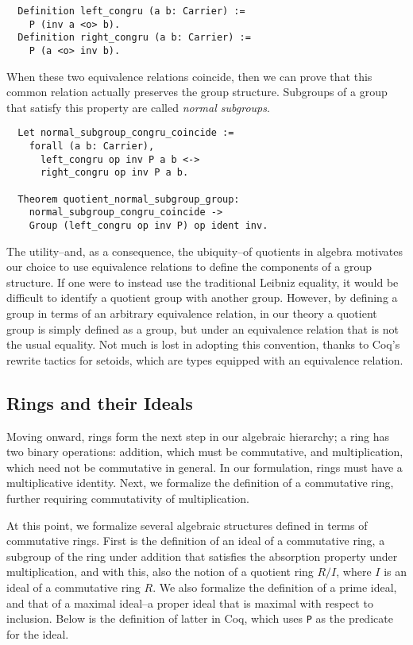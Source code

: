 \documentclass[referee,sn-mathphys]{sn-jnl}
\theoremstyle{definition}
\theoremstyle{remark}
\numberwithin{equation}{section}
\numberwithin{figure}{subsection}
\begin{document}
\begin{verbatim}
  Definition left_congru (a b: Carrier) :=
    P (inv a <o> b).
  Definition right_congru (a b: Carrier) :=
    P (a <o> inv b).
\end{verbatim}

When these two equivalence relations coincide, then we can prove that this common
 relation actually preserves the group structure. Subgroups of a group that satisfy 
this property are called \emph{normal subgroups}.

\begin{verbatim}
  Let normal_subgroup_congru_coincide :=
    forall (a b: Carrier),
      left_congru op inv P a b <->
      right_congru op inv P a b.

  Theorem quotient_normal_subgroup_group:
    normal_subgroup_congru_coincide ->
    Group (left_congru op inv P) op ident inv.
\end{verbatim}

The utility--and, as a consequence, the ubiquity--of quotients in algebra 
motivates our choice to use equivalence relations to define the components of a group structure. If one
were to instead use the traditional Leibniz equality, it would be difficult to
identify a quotient group with another group. However, by  defining a group in
terms of an arbitrary equivalence relation, in our theory a quotient group is 
simply defined as a group, but under an equivalence relation that is not the
usual equality. Not much is lost in adopting this convention, thanks to Coq's 
rewrite tactics for setoids, which are types equipped with an equivalence relation. 

\subsection{Rings and their Ideals}
Moving onward, rings form the next step in our algebraic hierarchy; a ring has
two binary operations: addition, which must be commutative, and multiplication,
which need not be commutative in general. In our formulation, rings must have a
multiplicative identity. Next, we formalize the definition of a commutative
ring, further requiring commutativity of multiplication.  

At this point, we formalize several algebraic structures defined in terms of commutative rings.
First is the definition of an ideal of a commutative ring, a subgroup of the ring
under addition that satisfies the absorption property under multiplication, and with this, also the 
notion of a quotient ring $R/I$, where $I$ is an ideal of a commutative ring
$R$.
We also formalize the definition of a  prime ideal, and that of a maximal ideal--a proper ideal that is maximal with respect to inclusion.
 Below is the definition of latter in Coq,
which uses \texttt{P} as the predicate for the ideal.
\end{document}
